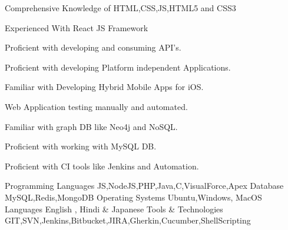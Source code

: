 \begin{cvitems}
	\item{Comprehensive Knowledge of HTML,CSS,JS,HTML5 and CSS3}
	\item{Experienced With React JS Framework}
	\item{Proficient with developing and consuming API’s.}
	\item{Proficient with developing Platform independent Applications.}
	\item{Familiar with Developing Hybrid Mobile Apps for iOS.}
	\item{Web Application testing manually and automated. }
	\item{Familiar with graph DB like Neo4j and NoSQL. }
	\item{Proficient with working with MySQL DB.}
	\item{Proficient with CI tools like Jenkins and Automation.}

\end{cvitems}

\begin{cvhonors}
  \cvhonor
    {Programming Languages}
    {JS,NodeJS,PHP,Java,C,VisualForce,Apex}
    {}
    {}
  \cvhonor
    {Database}
    {MySQL,Redis,MongoDB}
    {}
    {}  
  \cvhonor
    {Operating Systems}
    {Ubuntu,Windows, MacOS}
    {}
    {}  
  \cvhonor
    {Languages}
    {English , Hindi \& Japanese}
    {}
    {}  
  \cvhonor
    {Tools \& Technologies}
    {GIT,SVN,Jenkins,Bitbucket,JIRA,Gherkin,Cucumber,ShellScripting}
    {}
    {}   
\end{cvhonors}


